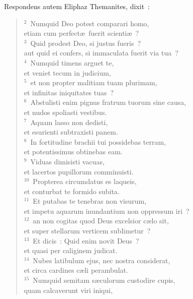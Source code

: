 \lettrine[lines=3,image=true,loversize=0.05,lraise=-0.03]{R}{}espondens autem Eliphaz Themanites, dixit~:
\begin{flushleft}\begin{verse}\vspace{6pt}${}^{2}$~Numquid Deo potest comparari homo,\\ etiam cum perfect\ae\ fuerit scienti\ae~?\\
${}^{3}$~Quid prodest Deo, si justus fueris~?\\ aut quid ei confers, si immaculata fuerit via tua~?\\
${}^{4}$~Numquid timens arguet te,\\ et veniet tecum in judicium,\\
${}^{5}$~et non propter malitiam tuam plurimam,\\ et infinitas iniquitates tuas~?\\
${}^{6}$~Abstulisti enim pignus fratrum tuorum sine causa,\\ et nudos spoliasti vestibus.\\
${}^{7}$~Aquam lasso non dedisti,\\ et esurienti subtraxisti panem.\\
${}^{8}$~In fortitudine brachii tui possidebas terram,\\ et potentissimus obtinebas eam.\\
${}^{9}$~Viduas dimisisti vacuas,\\ et lacertos pupillorum comminuisti.\\
${}^{10}$~Propterea circumdatus es laqueis,\\ et conturbat te formido subita.\\
${}^{11}$~Et putabas te tenebras non visurum,\\ et impetu aquarum inundantium non oppressum iri~?\\
${}^{12}$~an non cogitas quod Deus excelsior c\ae lo sit,\\ et super stellarum verticem sublimetur~?\\
${}^{13}$~Et dicis~: Quid enim novit Deus~?\\ et quasi per caliginem judicat.\\
${}^{14}$~Nubes latibulum ejus, nec nostra considerat,\\ et circa cardines c\ae li perambulat.\\
${}^{15}$~Numquid semitam s\ae culorum custodire cupis,\\ quam calcaverunt viri iniqui,\\

\end{verse}
\end{flushleft}
